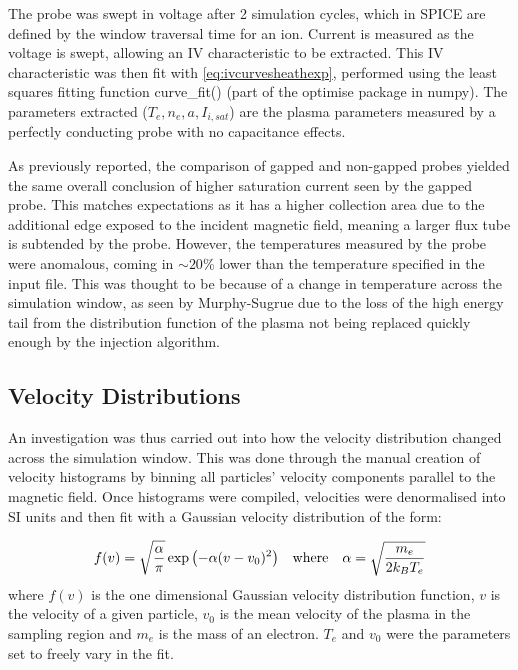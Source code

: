 \documentclass[a4paper, 11pt]{article} %
\begin{document}
	The probe was swept in voltage after 2 simulation cycles, which in SPICE are defined by the window traversal time for an ion.
	Current is measured as the voltage is swept, allowing an IV characteristic to be extracted.
	This IV characteristic was then fit with \cref{eq:ivcurvesheathexp}, performed using the least squares fitting function curve\_fit() (part of the optimise package in numpy). 
	The parameters extracted ($T_e, n_e, a, I_{i, sat}$) are the plasma parameters measured by a perfectly conducting probe with no capacitance effects.
	
	As previously reported, the comparison of gapped and non-gapped probes yielded the same overall conclusion of higher saturation current seen by the gapped probe. 
	This matches expectations as it has a higher collection area due to the additional edge exposed to the incident magnetic field, meaning a larger flux tube is subtended by the probe.
	However, the temperatures measured by the probe were anomalous, coming in $\sim20\%$ lower than the temperature specified in the input file. 
	This was thought to be because of a change in temperature across the simulation window, as seen by Murphy-Sugrue due to the loss of the high energy tail from the distribution function of the plasma not being replaced quickly enough by the injection algorithm.
	
\subsection{\label{subsec:injection}Velocity Distributions}
	An investigation was thus carried out into how the velocity distribution changed across the simulation window. 
	This was done through the manual creation of velocity histograms by binning all particles' velocity components parallel to the magnetic field. 
	Once histograms were compiled, velocities were denormalised into SI units and then fit with a Gaussian velocity distribution of the form:

	\begin{equation}
	\label{eq:gaussiandist}
		f(v) = \sqrt{\frac{\alpha}{\pi}} \exp{\left( -\alpha(v - v_0)^2\right) } \quad\textnormal{where}\quad \alpha = \sqrt{\frac{m_e}{2 k_B T_e}}
	\end{equation}
	where $f(v)$ is the one dimensional Gaussian velocity distribution function, $v$ is the velocity of a given particle, $v_0$ is the mean velocity of the plasma in the sampling region and $m_e$ is the mass of an electron.
	$T_e$ and $v_0$ were the parameters set to freely vary in the fit.
	
\end{document}
